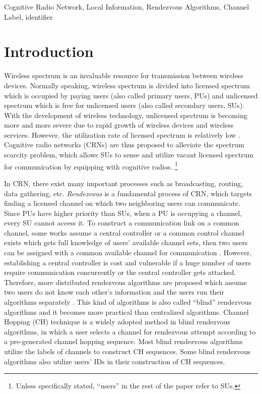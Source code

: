 \documentclass[10pt, conference, letterpaper]{IEEEtran}
\begin{document}
\begin{IEEEkeywords}
Cognitive Radio Network, Local Information, Rendezvous Algorithms, Channel Label, identifier
\end{IEEEkeywords}

\section{Introduction}
Wireless spectrum is an invaluable resource for transmission between wireless devices.
Normally speaking, wireless spectrum is divided into licensed spectrum which is occupied by paying users (also called primary users, PUs) and unlicensed spectrum which is free for unlicensed users (also called secondary users, SUs).
With the development of wireless technology, unlicensed spectrum is becoming more and more severe due to rapid growth of wireless devices \cite{Li2013Economic} and wireless services. However, the utilization rate of licensed spectrum is relatively low \cite{Min2014A} \cite{Jia2010Analysis}. Cognitive radio networks (CRNs) are thus proposed to alleviate the spectrum scarcity problem, which allows SUs to sense and utilize vacant licensed spectrum for communication by equipping with cognitive radios.
\footnote{Unless specifically stated, ``users'' in the rest of the paper refer to SUs.}


In CRN, there exist many important processes such as broadcasting, routing, data gathering, etc. \emph{Rendezvous} is a fundamental process of CRN, which targets finding a licensed channel on which two neighboring users can communicate.
Since PUs have higher priority than SUs, when a PU is occupying a channel, every SU cannot access it.
To construct a communication link on a common channel, some works assume a central controller or a common control channel exists which gets full knowledge of users' available channel sets, then two users can be assigned with a common available channel for communication\cite{Jia2008HC} \cite{Kondareddy2009Cognitive} \cite{Ma2005Dynamic} \cite{Perez2007A}. However, establishing a central controller is cost and vulnerable if a huge number of users require communication concurrently or the central controller gets attacked. Therefore, more distributed rendezvous algorithms are proposed which assume two users do not know each other's information and the users run their algorithms separately  \cite{Lin2013Enhanced} \cite{Gu2013Nearly} \cite{Shin2010A} \cite{Wu2013On} \cite{Wu2014Rendezvous}. This kind of algorithms is also called ``blind'' rendezvous algorithms and it becomes more practical than centralized algorithms. Channel Hopping (CH) technique \cite{Bian2009A} \cite{Bian2011Control} is a widely adopted method in blind rendezvous algorithms, in which a user selects a channel for rendezvous attempt according to a pre-generated channel hopping sequence.
Most blind rendezvous algorithms utilize the labels of channels to construct CH sequences. Some blind rendezvous algorithms also utilize users' IDs in their construction of CH sequences.
\end{document}
